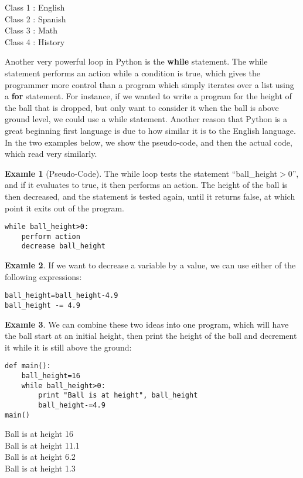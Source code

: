 \documentclass[12pt,openany]{book} %
\theoremstyle{definition}
\newtheorem{soln}{\textbf{Exam\smash{p}le} \nolinebreak }[section]
\newcounter{code}[section]
\begin{document}
\begin{out}{}{} Class 1 : English \\ Class 2 : Spanish \\ Class 3 : Math \\ Class 4 : History  \end{out}  
\vspace{8mm} Another very powerful loop in Python is the \textbf{while} statement.  The while statement performs an action while a condition is true, which gives the programmer more control than a program which simply iterates over a list using a \textbf{for} statement.  For instance, if we wanted to write a program for the height of the ball that is dropped, but only want to consider it when the ball is above ground level, we could use a while statement.   Another reason that Python is a great beginning first language is due to how similar it is to the English language.   In the two examples below, we show the pseudo-code, and then the actual code, which read very similarly.
\begin{soln}[Pseudo-Code]
The while loop tests the statement ``ball\_height$>$0'', and if it evaluates to true, it then performs an action.  The height of the ball is then decreased, and the statement is tested again, until it returns false, at which point it exits out of the program.  
\end{soln} 
\begin{code}{}{}
\begin{lstlisting}
while ball_height>0:
    perform action
    decrease ball_height
\end{lstlisting} \end{code}
\begin{soln}  If we want to decrease a variable by a value, we can use either of the following expressions: \end{soln}  
\begin{code}{}{} 
\begin{lstlisting}
ball_height=ball_height-4.9
ball_height -= 4.9
\end{lstlisting} \end{code}
\begin{soln}  We can combine these two ideas into one program, which will have the ball start at an initial height, then print the height of the ball and decrement it while it is still above the ground:  \end{soln}  
\begin{code}{}{}  
\begin{lstlisting}
def main():
    ball_height=16
    while ball_height>0:
        print "Ball is at height", ball_height
        ball_height-=4.9
main()
\end{lstlisting} \end{code}
\begin{out}{}{}  Ball is at height 16 \\
Ball is at height 11.1 \\
Ball is at height 6.2 \\ 
Ball is at height 1.3 \end{out}  
\end{document}
